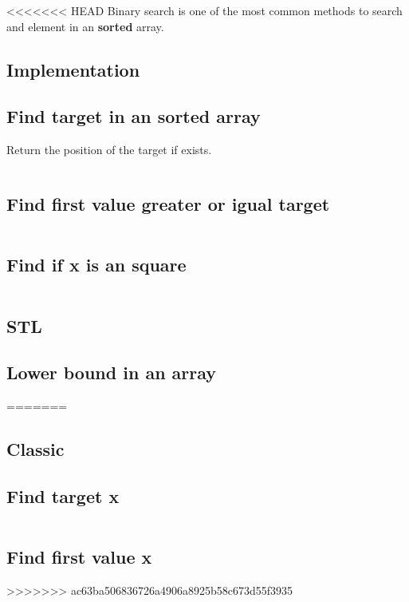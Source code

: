 <<<<<<< HEAD
Binary search is one of the most common methods to search and element in an \textbf{sorted} array.

\subsection{Implementation}
    \subsection{Find target in an sorted array}
        Return the position of the target if exists.
        \inputminted{cpp}{BinarySearch/Code/findTarget.cpp}
        
    \subsection{Find first value greater or igual target}
        \inputminted{cpp}{BinarySearch/Code/firstValueGEx.cpp}

    \subsection{Find if x is an square}
        \inputminted{cpp}{BinarySearch/Code/xSquare.cpp}

\subsection{STL}
	\subsection{Lower bound in an array}
=======
\subsection{Classic}
    \subsection{Find target x}
        \inputminted{cpp}{BinarySearch/Code/findTarget.cpp}
    \subsection{Find first value x}
>>>>>>> ac63ba506836726a4906a8925b58c673d55f3935
        \inputminted{cpp}{BinarySearch/Code/firstValueGEx.cpp}

